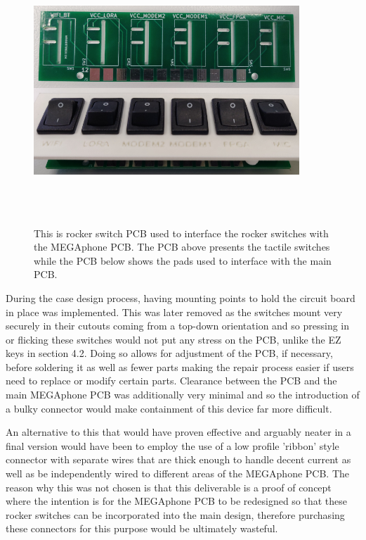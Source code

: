 \begin{figure} [h]
    \centering
    \includegraphics[width=10cm,height=10cm,keepaspectratio]{Figures/rockerswitchpcb.png}
    \caption{This is rocker switch PCB used to interface the rocker switches with the MEGAphone PCB. The PCB above presents the tactile switches while the PCB below shows the pads used to interface with the main PCB.}
    \label{fig:Rocker}
\end{figure}

During the case design process, having mounting points to hold the circuit board in place was implemented.
This was later removed as the switches mount very securely in their cutouts coming from a top-down orientation and so pressing in or flicking these switches would not put any stress on the PCB, unlike the EZ keys in section 4.2.
Doing so allows for adjustment of the PCB, if necessary, before soldering it as well as fewer parts making the repair process easier if users need to replace or modify certain parts.
Clearance between the PCB and the main MEGAphone PCB was additionally very minimal and so the introduction of a bulky connector would make containment of this device far more difficult.

An alternative to this that would have proven effective and arguably neater in a final version would have been to employ the use of a low profile 'ribbon' style connector with separate wires that are thick enough to handle decent current as well as be independently wired to different areas of the MEGAphone PCB.
The reason why this was not chosen is that this deliverable is a proof of concept where the intention is for the MEGAphone PCB to be redesigned so that these rocker switches can be incorporated into the main design, therefore purchasing these connectors for this purpose would be ultimately wasteful.

